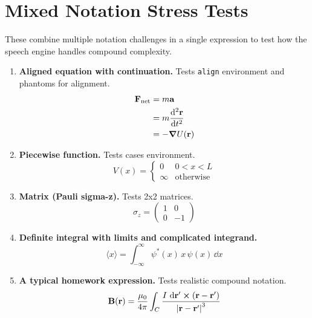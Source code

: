 \documentclass[11pt]{article}
\begin{document}
\section{Mixed Notation Stress Tests}

These combine multiple notation challenges in a single expression to
test how the speech engine handles compound complexity.

\begin{enumerate}

\item \textbf{Aligned equation with continuation.}
Tests \texttt{align} environment and phantoms for alignment.
\begin{align}
  \vb{F}_{\text{net}}
    &= m\vb{a} \\
  &= m\dv[2]{\vb{r}}{t} \\
  &= -\grad U(\vb{r})
\end{align}

\item \textbf{Piecewise function.}
Tests cases environment.
\[
  V(x) = \begin{cases}
    0 & 0 < x < L \\
    \infty & \text{otherwise}
  \end{cases}
\]

\item \textbf{Matrix (Pauli sigma-z).}
Tests 2x2 matrices.
\[
  \sigma_z = \begin{pmatrix} 1 & 0 \\ 0 & -1 \end{pmatrix}
\]

\item \textbf{Definite integral with limits and complicated integrand.}
\[
  \langle x \rangle =
  \int_{-\infty}^{\infty} \psi^*(x)\, x\, \psi(x)\, \dd{x}
\]

\item \textbf{A typical homework expression.}
Tests realistic compound notation.
\[
  \vb{B}(\vb{r}) = \frac{\mu_0}{4\pi} \int_C
  \frac{I\,\dd{\vb{r}'} \cross (\vb{r} - \vb{r}')}{\abs{\vb{r} - \vb{r}'}^3}
\]

\end{enumerate}
\end{document}
